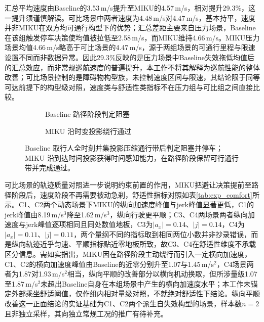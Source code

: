 \documentclass[a4paper,zihao=5]{ctexart}
\providecommand{\datapath}{../../图片/data/01_crossing_ped/}
\theoremstyle{definition}
\begin{document}
汇总平均速度由Baseline的3.53\,m/s提升至MIKU的4.57\,m/s，相对提升29.3\%，这一提升须谨慎解读。可比场景中两者速度为4.48\,m/s对4.47\,m/s，基本持平，速度并非MIKU在双方均可通行构型下的优势；汇总差距主要来自压力场景，Baseline在该组触发停车决策使均值被拉低至2.58\,m/s，而MIKU维持4.66\,m/s。MIKU压力场景均值4.66\,m/s略高于可比场景的4.47\,m/s，源于两组场景的可通行里程与限速设置不同而非数据异常。因此29.3\%反映的是压力场景中Baseline失效拖低均值后的汇总效应，而非常规巡航速度的普遍提升，本工作不将其解释为巡航性能的整体改善；可比场景控制的是障碍物构型族，未控制速度区间与限速，其结论限于同等可达前提下的构型级对照，速度类与舒适性类指标不在压力组与可比组之间直接比较。

\begin{figure}[htbp]
\centering
\begingroup
\renewcommand{\datapath}{../../图片/data/01_crossing_ped/}
\begin{subfigure}[b]{0.43\textwidth}
  \centering
  \caption{Baseline 路径阶段判定阻塞}
\end{subfigure}\hfill
\begin{subfigure}[b]{0.43\textwidth}
  \centering
  \caption{MIKU 沿时变投影绕行通过}
\end{subfigure}
\endgroup
\caption{压力场景 P1 单行人横穿的 SL 路径边界对照}
\caption*{Baseline 取行人全时刻并集投影压缩通行带后判定阻塞并停车；MIKU 沿到达时间投影获得时间感知能力，在路径阶段保留可行通行带并完成通过。}
\label{fig:exp_p1_sl}
\end{figure}

可比场景的轨迹质量对照进一步说明约束前置的作用，MIKU把避让决策提前至路径阶段后，速度阶段不再需要被动急刹，舒适性指标对照如表\ref{tab:exp_comfort}所示。C1、C2两个动态场景下MIKU的纵向加速度峰值与jerk峰值显著更低，C1的jerk峰值由8.19\,m/s$^3$降至1.62\,m/s$^3$，纵向行驶更平顺；C3、C4两场景两者纵向加速度与jerk峰值逐项相同且同处数值地板，C3为$|a_x|=0.14$、$|j|=0.14$，C4为$|a_x|=0.11$、$|j|=0.11$，两个量纲不同的指标取到相同两位小数并非抄录错误，而是纵向轨迹近乎匀速、平顺指标贴近零地板所致，故C3、C4在舒适性维度不承载区分信息。需如实指出，MIKU因在路径阶段主动绕行而引入一定横向加速度，C1、C2的横向加速度峰值由Baseline的近零分别升至1.07与1.45\,m/s$^2$，C4场景两者为1.87对1.93\,m/s$^2$相当，纵向平顺的改善部分以横向机动换取，但所涉量级1.07至1.87\,m/s$^2$未超出Baseline自身在本组场景中产生的横向加速度水平；本工作未锚定外部乘坐舒适阈值，仅作组内相对量级对照，不就绝对舒适性下结论。纵向平顺改善这一正面结论的实证基础为C1、C2两个派生自失效构型的场景，样本数$n=2$且非独立采样，其向独立常规工况的推广有待补充。
\end{document}

